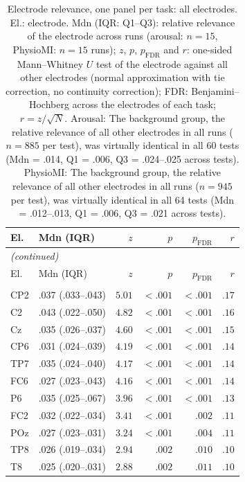 {\small\setlength{\tabcolsep}{4pt}
\begin{longtable}{llrrrr}
\caption{Electrode relevance, one panel per task: all electrodes. El.: electrode. Mdn (IQR: Q1--Q3): relative relevance of the electrode across runs (arousal: $n = 15$, PhysioMI: $n = 15$ runs); $z$, $p$, $p_{\mathrm{FDR}}$ and $r$: one-sided Mann--Whitney $U$ test of the electrode against all other electrodes (normal approximation with tie correction, no continuity correction); FDR: Benjamini--Hochberg across the electrodes of each task; $r = z / \sqrt{N}$. Arousal: The background group, the relative relevance of all other electrodes in all runs ($n = 885$ per test), was virtually identical in all 60 tests (Mdn = .014, Q1 = .006, Q3 = .024--.025 across tests). PhysioMI: The background group, the relative relevance of all other electrodes in all runs ($n = 945$ per test), was virtually identical in all 64 tests (Mdn = .012--.013, Q1 = .006, Q3 = .021 across tests).}\label{tab:electrode_summary_both_tasks_all} \\
\toprule
El. & Mdn (IQR) & $z$ & $p$ & $p_{\mathrm{FDR}}$ & $r$ \\
\midrule
\endfirsthead
\multicolumn{6}{l}{\emph{(continued)}} \\
\toprule
El. & Mdn (IQR) & $z$ & $p$ & $p_{\mathrm{FDR}}$ & $r$ \\
\midrule
\endhead
\bottomrule
\endfoot
\multicolumn{6}{l}{\textit{Arousal}} \\
CP2 & .037 (.033--.043) & $5.01$ & $< .001$ & $< .001$ & $.17$ \\
C2 & .043 (.022--.050) & $4.82$ & $< .001$ & $< .001$ & $.16$ \\
Cz & .035 (.026--.037) & $4.60$ & $< .001$ & $< .001$ & $.15$ \\
CP6 & .031 (.024--.039) & $4.19$ & $< .001$ & $< .001$ & $.14$ \\
TP7 & .035 (.024--.040) & $4.17$ & $< .001$ & $< .001$ & $.14$ \\
FC6 & .027 (.023--.043) & $4.16$ & $< .001$ & $< .001$ & $.14$ \\
P6 & .035 (.025--.067) & $3.96$ & $< .001$ & $< .001$ & $.13$ \\
FC2 & .032 (.022--.034) & $3.41$ & $< .001$ & $.002$ & $.11$ \\
POz & .027 (.023--.031) & $3.24$ & $< .001$ & $.004$ & $.11$ \\
TP8 & .026 (.019--.034) & $2.94$ & $.002$ & $.010$ & $.10$ \\
T8 & .025 (.020--.031) & $2.88$ & $.002$ & $.011$ & $.10$ \\

\end{longtable}}
